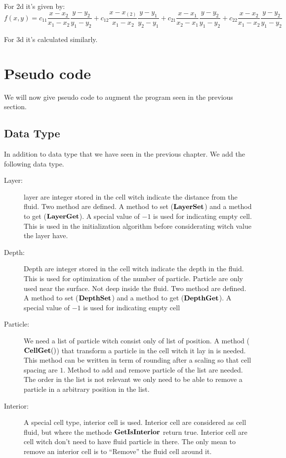For 2d it's given by:
\begin{equation}
	f(x,y)=c_{11}\frac{x-x_{2}}{x_{1}-x_{2}}\frac{y-y_{2}}{y_{1}-y_{2}}+c_{12}\frac{x-x_(2)}{x_{1}-x_{2}}\frac{y-y_{1}}{y_{2}-y_{1}}
	+c_{21}\frac{x-x_{1}}{x_{2}-x_{1}}\frac{y-y_{2}}{y_{1}-y_{2}}+c_{22}\frac{x-x_{2}}{x_{1}-x_{2}}\frac{y-y_{2}}{y_{1}-y_{2}}
\end{equation}

For 3d it's calculated similarly.

\section{Pseudo code}

We will now give pseudo code to augment the program seen in the previous section.

\subsection{Data Type}

In addition to data type that we have seen in the previous chapter. We add the following data type.

\begin{description}
\item[Layer:]
layer are integer stored in the cell witch indicate the distance from the fluid.
Two method are defined. A method to set ($\mathop{\textbf{LayerSet}}$) and a method to get ($\mathop{\textbf{LayerGet}}$).
A special value of $-1$ is used for indicating empty cell. This is used in the initialization algorithm before considerating
witch value the layer have.
\item[Depth:]
Depth are integer stored in the cell witch indicate the depth in the fluid.
This is used for optimization of the number of particle. Particle are only used near the surface.
Not deep inside the fluid.
Two method are defined. A method to set ($\mathop{\textbf{DepthSet}}$) and a method to get ($\mathop{\textbf{DepthGet}}$).
A special value of $-1$ is used for indicating empty cell
\item[Particle:]
We need a list of particle witch consist only of list of position.
A method ($\mathop{\textbf{CellGet}}()$) that transform a particle in the cell witch it lay in is needed.
This method can be written in term of rounding after a scaling so that cell spacing are $1$.
Method to add and remove particle of the list are needed.
The order in the list is not relevant we only need to be able to remove a particle in a arbitrary position in the list.
\item[Interior:]
A special cell type, interior cell is used.
Interior cell are considered as cell fluid, but where the methode $\mathop{\textbf{GetIsInterior}}$ return true.
Interior cell are cell witch don't need to have fluid particle in there.
The only mean to remove an interior cell is to ``Remove'' the fluid cell around it.
\end{description}

